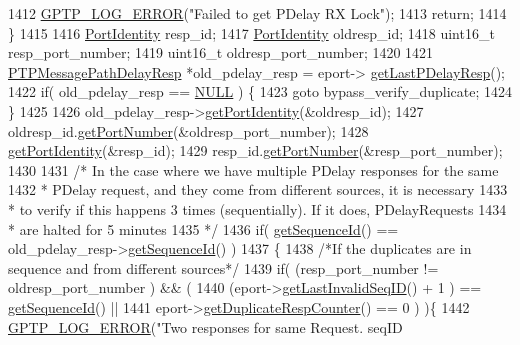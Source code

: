 \begin{DoxyCode}
1412         \hyperlink{gptp__log_8hpp_afefbb1009717c128012bfeed94842987}{GPTP\_LOG\_ERROR}(\textcolor{stringliteral}{"Failed to get PDelay RX Lock"});
1413         \textcolor{keywordflow}{return};
1414     \}
1415 
1416     \hyperlink{class_port_identity}{PortIdentity} resp\_id;
1417     \hyperlink{class_port_identity}{PortIdentity} oldresp\_id;
1418     uint16\_t resp\_port\_number;
1419     uint16\_t oldresp\_port\_number;
1420 
1421     \hyperlink{class_p_t_p_message_path_delay_resp}{PTPMessagePathDelayResp} *old\_pdelay\_resp = eport->
      \hyperlink{class_ether_port_a3afa6852a50e5e448a00418873a59eb1}{getLastPDelayResp}();
1422     \textcolor{keywordflow}{if}( old\_pdelay\_resp == \hyperlink{openavb__types__base__pub_8h_a070d2ce7b6bb7e5c05602aa8c308d0c4}{NULL} ) \{
1423         \textcolor{keywordflow}{goto} bypass\_verify\_duplicate;
1424     \}
1425 
1426     old\_pdelay\_resp->\hyperlink{class_p_t_p_message_common_a81caf27b0bcf771cb3c35d8fe42ae8ed}{getPortIdentity}(&oldresp\_id);
1427     oldresp\_id.\hyperlink{class_port_identity_ad9d12804c253a7c8138a4bfbe87eddba}{getPortNumber}(&oldresp\_port\_number);
1428     \hyperlink{class_p_t_p_message_common_a81caf27b0bcf771cb3c35d8fe42ae8ed}{getPortIdentity}(&resp\_id);
1429     resp\_id.\hyperlink{class_port_identity_ad9d12804c253a7c8138a4bfbe87eddba}{getPortNumber}(&resp\_port\_number);
1430 
1431     \textcolor{comment}{/* In the case where we have multiple PDelay responses for the same}
1432 \textcolor{comment}{     * PDelay request, and they come from different sources, it is necessary}
1433 \textcolor{comment}{     * to verify if this happens 3 times (sequentially). If it does, PDelayRequests}
1434 \textcolor{comment}{     * are halted for 5 minutes}
1435 \textcolor{comment}{     */}
1436     \textcolor{keywordflow}{if}( \hyperlink{class_p_t_p_message_common_abd5cac5701120cbbfc56129b31fa801f}{getSequenceId}() == old\_pdelay\_resp->\hyperlink{class_p_t_p_message_common_abd5cac5701120cbbfc56129b31fa801f}{getSequenceId}() )
1437     \{
1438         \textcolor{comment}{/*If the duplicates are in sequence and from different sources*/}
1439         \textcolor{keywordflow}{if}( (resp\_port\_number != oldresp\_port\_number ) && (
1440                     (eport->\hyperlink{class_ether_port_afbd9c6b9136482c155a71352d04e8681}{getLastInvalidSeqID}() + 1 ) == 
      \hyperlink{class_p_t_p_message_common_abd5cac5701120cbbfc56129b31fa801f}{getSequenceId}() ||
1441                     eport->\hyperlink{class_ether_port_ac927251aaee6968568592547a965d770}{getDuplicateRespCounter}() == 0 ) )\{
1442             \hyperlink{gptp__log_8hpp_afefbb1009717c128012bfeed94842987}{GPTP\_LOG\_ERROR}(\textcolor{stringliteral}{"Two responses for same Request. seqID %
}
\end{DoxyCode}

